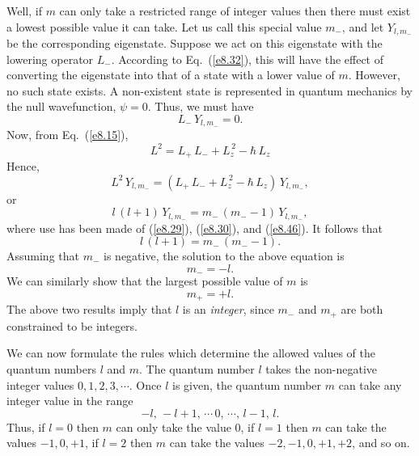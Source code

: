 Well, if $m$ can only take a restricted range of integer values  then there
must exist a lowest possible value it can take. Let us call this special value $m_-$,
and let $Y_{l,m_-}$ be the corresponding eigenstate. Suppose
we act on this eigenstate with the lowering operator $L_-$.  According
to Eq.~(\ref{e8.32}), this will have the effect of converting the
eigenstate into that of a state with a lower value of $m$. However,
no such state exists. A non-existent state is represented in quantum
mechanics by the null wavefunction, $\psi=0$. Thus, we must have
\begin{equation}\label{e8.46}
L_-\,Y_{l,m_-} = 0.
\end{equation}
Now, from Eq.~(\ref{e8.15}),
\begin{equation}
L^2 = L_+\,L_-+L_z^{\,2} - \hbar\,L_z
\end{equation}
Hence,
\begin{equation}
L^2\,Y_{l,m_-} = (L_+\,L_-+L_z^{\,2} - \hbar\,L_z)\,Y_{l,m_-},
\end{equation}
or
\begin{equation}
l\,(l+1)\,Y_{l,m_-} = m_-\,(m_- -1)\,Y_{l,m_-},
\end{equation}
where use has been made of (\ref{e8.29}), (\ref{e8.30}), and (\ref{e8.46}).
It follows that
\begin{equation}
l\,(l+1) = m_-\,(m_--1).
\end{equation}
Assuming that $m_-$ is negative, the solution to the above equation
is
\begin{equation}
m_- = - l.
\end{equation}
We can similarly show that the largest possible value of $m$ is
\begin{equation}
m_+ =+ l.
\end{equation}
The above two results imply that $l$ is an {\em integer}, since
$m_-$ and $m_+$ are both constrained to be integers. 

We can now formulate the rules which determine the allowed values
of the quantum numbers $l$ and $m$. The quantum number $l$
takes the non-negative integer values $0, 1, 2, 3, \cdots$. Once
$l$ is given, the quantum number $m$ can take any integer value in the
range
\begin{equation}
-l,\,-l+1,\,\cdots\, 0, \,\cdots,\, l-1,\, l.
\end{equation}
Thus, if $l=0$ then $m$ can only take the value $0$, if $l=1$ then
$m$ can take the values $-1, 0, +1$, if $l=2$ then $m$ can take
the values $-2,-1,0,+1,+2$, and so on.

